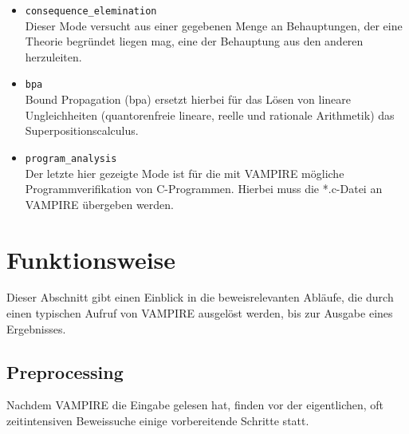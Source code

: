 \documentclass{article}
\begin{document}
\begin{itemize}
\begin{itemize}
	\item \verb|consequence_elemination| \\
	Dieser Mode versucht aus einer gegebenen Menge an Behauptungen, der eine Theorie begründet liegen mag, eine der Behauptung aus den anderen herzuleiten.
	\item \verb|bpa| \\
	Bound Propagation (bpa) ersetzt hierbei für das Lösen von lineare Ungleichheiten (quantorenfreie lineare, reelle und rationale Arithmetik) das Superpositionscalculus.
	\item \verb|program_analysis| \\
	Der letzte hier gezeigte Mode ist für die mit VAMPIRE mögliche Programmverifikation von C-Programmen. Hierbei muss die *.c-Datei an VAMPIRE übergeben werden.
\end{itemize}

\end{itemize} %





\section{Funktionsweise}
\label{sec:mechanics}


Dieser Abschnitt gibt einen Einblick in die beweisrelevanten Abläufe, die durch einen typischen Aufruf von VAMPIRE ausgelöst werden, bis zur Ausgabe eines Ergebnisses.


\subsection{Preprocessing}
\label{subsec:preprocessing}

Nachdem VAMPIRE die Eingabe gelesen hat, finden vor der eigentlichen, oft zeitintensiven
Beweissuche einige vorbereitende Schritte statt.
\end{document}
